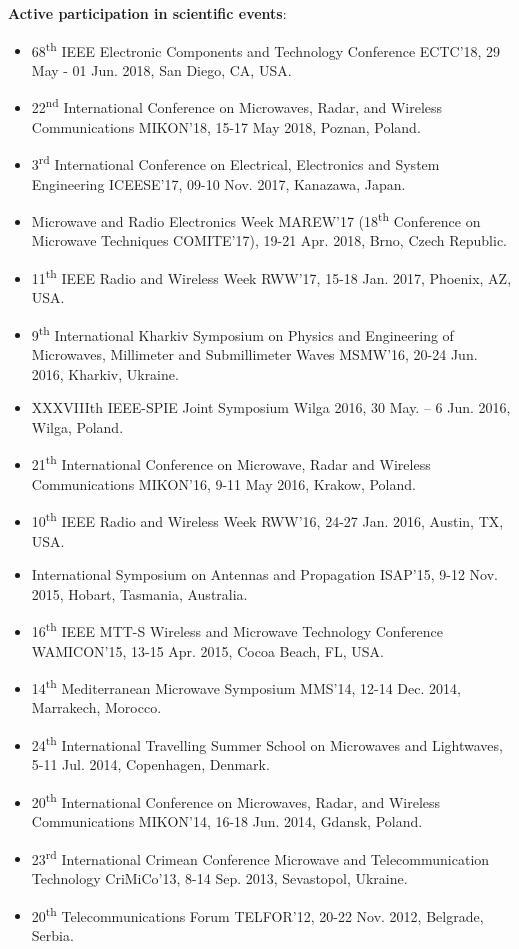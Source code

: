 \noindent \textbf{Active participation in scientific events}:
\begin{itemize}[nosep]
\item 68\textsuperscript{th} IEEE Electronic Components and Technology Conference ECTC'18, 29 May - 01 Jun. 2018, San Diego, CA, USA.
\item 22\textsuperscript{nd} International Conference on Microwaves, Radar, and Wireless Communications MIKON'18, 15-17 May 2018, Poznan, Poland.
\item 3\textsuperscript{rd} International Conference on Electrical, Electronics and System Engineering ICEESE'17, 09-10 Nov. 2017, Kanazawa, Japan.
\item Microwave and Radio Electronics Week MAREW'17 (18\textsuperscript{th} Conference on Microwave Techniques COMITE'17), 19-21 Apr. 2018, Brno, Czech Republic.
\item 11\textsuperscript{th} IEEE Radio and Wireless Week RWW'17, 15-18 Jan. 2017, Phoenix, AZ, USA. %
\item 9\textsuperscript{th} International Kharkiv Symposium on Physics and Engineering of Microwaves, Millimeter and Submillimeter Waves MSMW'16, 20-24 Jun. 2016, Kharkiv, Ukraine.
\item XXXVIIIth IEEE-SPIE Joint Symposium Wilga 2016, 30 May. – 6 Jun. 2016, Wilga, Poland.
\item 21\textsuperscript{th} International Conference on Microwave, Radar and Wireless Communications MIKON'16, 9-11 May 2016, Krakow, Poland.
\item 10\textsuperscript{th} IEEE Radio and Wireless Week RWW'16, 24-27 Jan. 2016, Austin, TX, USA. %
\item International Symposium on Antennas and Propagation ISAP'15, 9-12 Nov. 2015, Hobart, Tasmania, Australia.
\item 16\textsuperscript{th} IEEE MTT-S Wireless and Microwave Technology Conference WAMICON'15, 13-15 Apr. 2015, Cocoa Beach, FL, USA.
\item 14\textsuperscript{th} Mediterranean Microwave Symposium MMS'14, 12-14 Dec. 2014, Marrakech, Morocco.
\item 24\textsuperscript{th} International Travelling Summer School on Microwaves and Lightwaves, 5-11 Jul. 2014, Copenhagen, Denmark.
\item 20\textsuperscript{th} International Conference on Microwaves, Radar, and Wireless Communications MIKON'14, 16-18 Jun. 2014, Gdansk, Poland.
\item 23\textsuperscript{rd} International Crimean Conference Microwave and Telecommunication Technology CriMiCo'13, 8-14 Sep. 2013, Sevastopol, Ukraine. %
\item 20\textsuperscript{th} Telecommunications Forum TELFOR'12, 20-22 Nov. 2012, Belgrade, Serbia.
\end{itemize}
\vspace*{1cm} %

